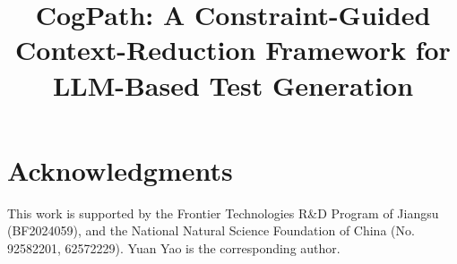 \documentclass[10pt,conference]{IEEEtran}
\begin{document}
\title{CogPath: A Constraint-Guided Context-Reduction Framework for LLM-Based Test Generation}

\author{
}


\maketitle



















\section*{Acknowledgments}

This work is supported by the Frontier Technologies R\&D Program of Jiangsu (BF2024059), and the National Natural Science Foundation of China (No. 92582201, 62572229).
%
%
Yuan Yao is the corresponding author.



\end{document}
